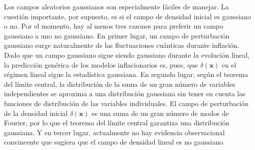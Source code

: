 Los campos aleatorios gaussianos son especialmente fáciles de manejar. La cuestión importante, por supuesto, es si el campo de densidad inicial es gaussiano o no. Por el momento, hay al menos tres razones para preferir un campo gaussiano a uno no gaussiano. En primer lugar, un campo de perturbación gaussiano surge naturalmente de las fluctuaciones cuánticas durante inflación. Dado que un campo gaussiano sigue siendo gaussiano durante la evolución lineal, la predicción genérica de los modelos inflacionarios es, pues, que \(\delta(\symbf{x})\) en el régimen lineal sigue la estadística gaussiana. En segundo lugar, según el teorema del límite central, la distribución de la suma de un gran número de variables independientes se aproxima a una distribución gaussiana sin tener en cuenta las funciones de distribución de las variables individuales. El campo de perturbación de la densidad inicial \(\delta(\symbf{x})\) es una suma de un gran número de modos de Fourier, por lo que el teorema del límite central garantiza una distribución gaussiana. Y en tercer lugar, actualmente no hay evidencia observacional convincente que sugiera que el campo de densidad lineal es no gaussiano.
